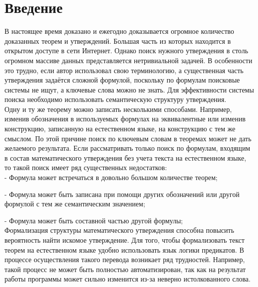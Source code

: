 \documentclass[12pt]{article}
\begin{document}

\newpage
\begin{center}
\tableofcontents \vspace{3cm}
\end{center}



\newpage

\section*{Введение}
В настоящее время доказано и ежегодно доказывается огромное количество доказанных теорем и утверждений. Большая часть из которых находится в открытом доступе в сети Интернет. Однако поиск нужного утверждения в столь огромном массиве данных представляется нетривиальной задачей. В особенности это трудно, если автор использовал свою терминологию, а существенная часть утверждения задаётся сложной формулой, поскольку по формулам поисковые системы не ищут, а ключевые слова можно не знать. Для эффективности системы поиска необходимо использовать семантическую структуру утверждения. \\

Одну и ту же теорему можно записать несколькими способами. Например, изменив обозначения  в используемых формулах на эквивалентные или изменив конструкцию, записанную на естественном языке, на конструкцию с тем же смыслом. По этой причине поиск по ключевым словам в теоремах может не дать желаемого результата. Если рассматривать только поиск по формулам, входящим в состав математического утверждения без учета текста на естественном языке, то такой поиск имеет ряд существенных недостатков: \\

- Формула может встречаться в довольно большом количестве теорем;

- Формула может быть записана при помощи других обозначений или другой формулой с тем же семантическим значением;

- Формула может быть составной частью другой формулы;\\

Формализация структуры математического утверждения способна повысить вероятность найти искомое утверждение. Для того, чтобы формализовать текст теорем на естественном языке удобно использовать язык логики предикатов. В процессе осуществления такого перевода возникает ряд трудностей. Например, такой процесс не может быть полностью автоматизирован, так как на результат работы программы может сильно изменится из-за неверно истолкованного слова. \\
\end{document}
